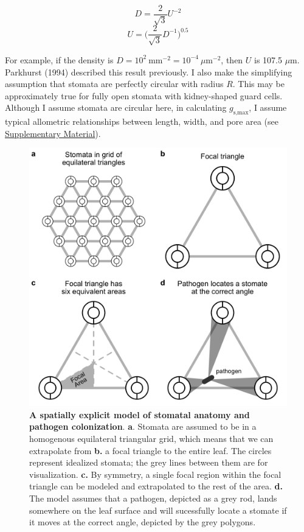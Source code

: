 \documentclass[utf8]{frontiersSCNS}
\newcommand{\gsmax}{$g_\text{s,max}$}
\begin{document}
\[ D = \frac{2}{\sqrt{3}} U ^{-2} \]
\[ U = \bigg(\frac{2}{\sqrt{3}} D ^{-1}\bigg) ^ {0.5} \]

For example, if the density is
\(D = 10 ^ 2~\textrm{mm}^{-2} = 10 ^ {-4}~\mu\textrm{m}^{-2}\), then
\(U\) is 107.5 \(\mu \textrm{m}\). Parkhurst (1994) described this
result previously. I also make the simplifying assumption that stomata
are perfectly circular with radius \(R\). This may be approximately true
for fully open stomata with kidney-shaped guard cells. Although I assume
stomata are circular here, in calculating \gsmax, I assume typical
allometric relationships between length, width, and pore area (see
\protect\hyperlink{supplementary-material}{Supplementary Material}).

\begin{figure}
  \centering
    \includegraphics[width=6.5in]{../figures/fig1.jpeg}
    \caption{\textbf{A spatially explicit model of stomatal anatomy and pathogen colonization}. \textbf{a}. Stomata are assumed to be in a homogenous equilateral triangular grid, which means that we can extrapolate from \textbf{b.} a focal triangle to the entire leaf. The circles represent idealized stomata; the grey lines between them are for visualization. \textbf{c.} By symmetry, a single focal region within the focal triangle can be modeled and extrapolated to the rest of the area. \textbf{d.} The model assumes that a pathogen, depicted as a grey rod, lands somewhere on the leaf surface and will sucessfully locate a stomate if it moves at the correct angle, depicted by the grey polygons.}
    \label{fig:fig1}
\end{figure}
\end{document}
